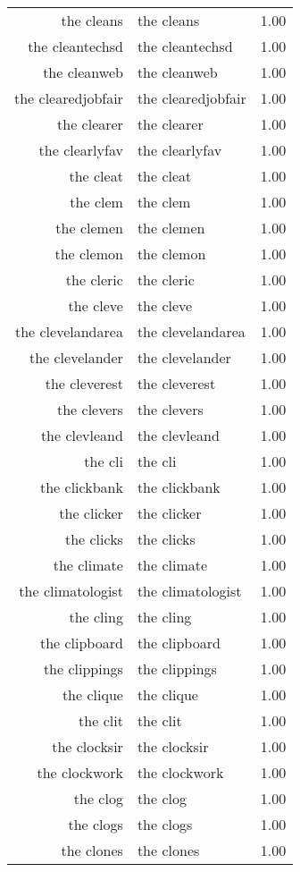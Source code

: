 \begin{table}[ht]
\begin{tabular}{rlr}
  the cleans & the cleans & 1.00 \\ 
  the cleantechsd & the cleantechsd & 1.00 \\ 
  the cleanweb & the cleanweb & 1.00 \\ 
  the clearedjobfair & the clearedjobfair & 1.00 \\ 
  the clearer & the clearer & 1.00 \\ 
  the clearlyfav & the clearlyfav & 1.00 \\ 
  the cleat & the cleat & 1.00 \\ 
  the clem & the clem & 1.00 \\ 
  the clemen & the clemen & 1.00 \\ 
  the clemon & the clemon & 1.00 \\ 
  the cleric & the cleric & 1.00 \\ 
  the cleve & the cleve & 1.00 \\ 
  the clevelandarea & the clevelandarea & 1.00 \\ 
  the clevelander & the clevelander & 1.00 \\ 
  the cleverest & the cleverest & 1.00 \\ 
  the clevers & the clevers & 1.00 \\ 
  the clevleand & the clevleand & 1.00 \\ 
  the cli & the cli & 1.00 \\ 
  the clickbank & the clickbank & 1.00 \\ 
  the clicker & the clicker & 1.00 \\ 
  the clicks & the clicks & 1.00 \\ 
  the climate & the climate & 1.00 \\ 
  the climatologist & the climatologist & 1.00 \\ 
  the cling & the cling & 1.00 \\ 
  the clipboard & the clipboard & 1.00 \\ 
  the clippings & the clippings & 1.00 \\ 
  the clique & the clique & 1.00 \\ 
  the clit & the clit & 1.00 \\ 
  the clocksir & the clocksir & 1.00 \\ 
  the clockwork & the clockwork & 1.00 \\ 
  the clog & the clog & 1.00 \\ 
  the clogs & the clogs & 1.00 \\ 
  the clones & the clones & 1.00 \\ 

\end{tabular}
\end{table}
